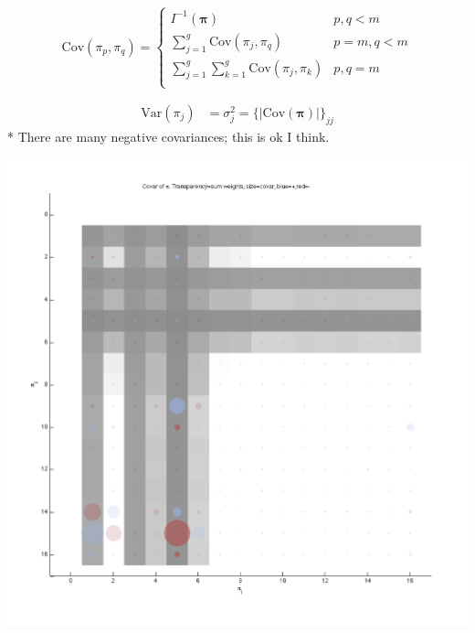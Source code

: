 \documentclass[12pt]{amsart}
\newcommand{\vect}[1]{\boldsymbol{\mathbf{#1}}}
\newcommand{\eqn}[1]{\begin{align*}
#1
\end{align*}}
\newcommand{\Bl}{\Big\{}
\newcommand{\Br}{\Big\}}
\newcommand{\eqnset}[4]{
\[ #1 = #2 \left\{ \begin{array}{#3}
        #4
\end{array} \right. \] 
}
\newcommand{\vp}{\vect{\pi}}
\newcommand{\vph}{\hat{\vect{\pi}}}
\begin{document}
\eqnset{\text{Cov}(\pi_p,\pi_q)}{}{ll}{
	I^{-1}(\vph) 				& p,q<m	\\
	\sum\limits_{j=1}^g \text{Cov}(\pi_j,\pi_q)		& p=m,q<m	\\
	\sum\limits_{j=1}^g \sum\limits_{k=1}^g \text{Cov}(\pi_j,\pi_k)		& p, q=m	\\
}

\eqn{
	\text{Var}(\pi_j) &= \sigma^2_j = \Bl \big | \text{Cov}(\vp) \big | \Br_{jj}
}
* There are many negative covariances; this is ok I think.



\begin{center}
	\includegraphics[scale=0.42]{covar.pdf}
\end{center}
\end{document}
